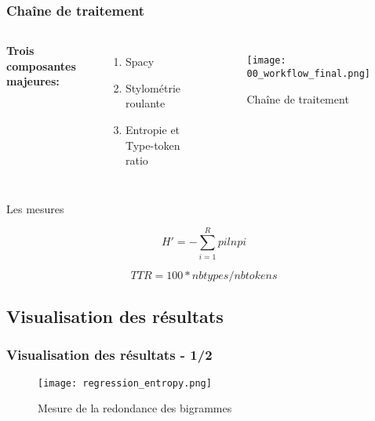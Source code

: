 \documentclass{beamer}
\begin{document}
\begin{frame}
\frametitle{Chaîne de traitement}
\begin{columns}[c]

\textbf{Trois composantes majeures:}
\begin{enumerate}
\item Spacy
\item Stylométrie roulante
\item Entropie et Type-token ratio
\end{enumerate}

\begin{figure}
    \centering
    \texttt{[image: 00\_workflow\_final.png]}
    \caption{Chaîne de traitement}
    \label{workflow}
\end{figure}

\end{columns}
\end{frame}


\begin{frame}{Les mesures}

\begin{theorem}[Entropy]
\begin{equation}
H\ensuremath{\prime}=-\sum_{i=1}^R pi ln pi
\end{equation}
\end{theorem}
\begin{theorem}
\begin{equation}
TTR = 100 * nb types / nb tokens
\end{equation}
\end{theorem}

\end{frame}

\subsection{Visualisation des résultats}

\begin{frame}
\frametitle{Visualisation des résultats - 1/2}
\begin{figure}
    \centering
    \texttt{[image: regression\_entropy.png]}
    \caption{Mesure de la redondance des bigrammes}
    \label{entropy}
\end{figure}
\end{frame}
\end{document}
